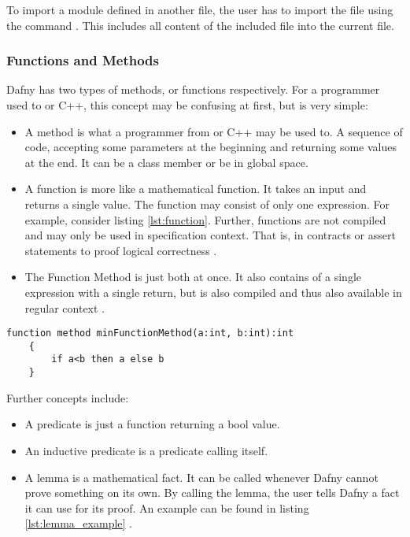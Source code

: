 To import a module defined in another file, the user has to import the file using the command .
This includes all content of the included file into the current file.

\subsubsection{Functions and Methods}
Dafny has two types of methods, or functions respectively.
For a programmer used to \Csharp or C++, this concept may be confusing at first, but is very simple:
\begin{itemize}
\item A method is what a programmer from \Csharp or C++ may be used to.
A sequence of code, accepting some parameters at the beginning and returning some values at the end.
It can be a class member or be in global space.
\item A function is more like a mathematical function.
It takes an input and returns a single value.
The function may consist of only one expression.
For example, consider listing \ref{lst:function}.
Further, functions are not compiled and may only be used in specification context.
That is, in contracts or assert statements to proof logical correctness \cite{functionVSMethod}.
\item The Function Method is just both at once.
It also contains of a single expression with a single return, but is also compiled and thus also available in regular context \cite{functionVSMethod}.
\end{itemize}

\begin{lstlisting}[caption={Function}, captionpos=b, label={lst:function}]
    function method minFunctionMethod(a:int, b:int):int
    {
        if a<b then a else b
    }
\end{lstlisting}

Further concepts include:
\begin{itemize}
\item A predicate is just a function returning a bool value.
\item An inductive predicate is a predicate calling itself.
\item A lemma is a mathematical fact.
It can be called whenever Dafny cannot prove something on its own.
By calling the lemma, the user tells Dafny a fact it can use for its proof.
An example can be found in listing \ref{lst:lemma_example} \cite{dafnyReferenceManual}.
\end{itemize}

